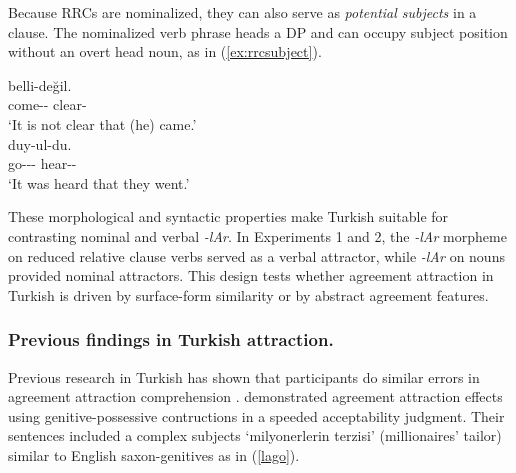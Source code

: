 \documentclass[
  authoryear,
  preprint]{elsarticle}
\begin{document}
Because RRCs are nominalized, they can also serve as
\emph{potential subjects} in a clause. The nominalized verb phrase heads
a DP and can occupy subject position without an overt head noun, as in
(\ref{ex:rrcsubject}).

\begin{exe}
\ex \label{ex:rrcsubject}
 belli-değil.\\
come-\Nmlz{}-\Poss{} clear-\Neg{}\\
\glt `It is not clear that (he) came.'\\
 duy-ul-du.\\
go-\Nmlz{}-\Pl{}-\Poss{} hear-\Pass{}-\Pst{}\\
\glt `It was heard that they went.'
\end{exe}

These morphological and syntactic properties make Turkish suitable for
contrasting nominal and verbal \emph{-lAr}. In Experiments 1 and 2, the
\emph{-lAr} morpheme on reduced relative clause verbs served as a verbal
attractor, while \emph{-lAr} on nouns provided nominal attractors. This
design tests whether agreement attraction in Turkish is driven by
surface-form similarity or by abstract agreement features.

\subsubsection{Previous findings in Turkish
attraction.}\label{previous-findings-in-turkish-attraction.}

Previous research in Turkish has shown that participants do similar
errors in agreement attraction comprehension
\citep{LagoEtAl2019, TurkLogacev2024, Ulusoy2023}. \citet{LagoEtAl2019}
demonstrated agreement attraction effects using genitive-possessive
contructions in a speeded acceptability judgment. Their sentences
included a complex subjects `milyonerlerin terzisi' (millionaires'
tailor) similar to English saxon-genitives as in (\ref{lago}).

\begin{exe}
\end{exe}
\end{document}

